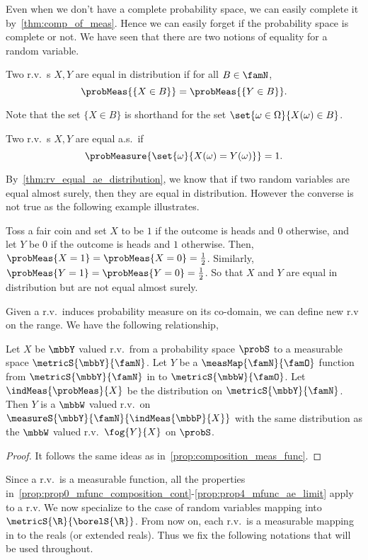Even when we don't have a complete probability space, we can easily complete it by~\ref{thm:comp_of_meas}.
Hence we can easily forget if the probability space is complete or not. We have seen that there are 
two notions of equality for a random variable. 
\begin{Definition}
    Two r.v.~s $X,Y$ are equal in distribution if for all $B \in \famN$, 
    \[\probMeas{\lbrace X\in B \rbrace} = \probMeas{\lbrace Y\in B\rbrace}.\]
\end{Definition}
Note that the set ${\lbrace X\in B \rbrace}$ is shorthand for the set $\set{\omega\in\Omega}{X(\omega)\in B}$.
\begin{Definition}
Two r.v.~s $X,Y$ are equal a.s.~if 
\[\probMeasure{\set{\omega}{X(\omega)=Y(\omega)}} = 1.\]
\end{Definition}
By~\ref{thm:rv_equal_ae_distribution}, we know that if two random variables are equal almost surely, then they
are equal in distribution.
However the converse is not true as the following example illustrates.
\begin{Example}
    Toss a fair coin and set $X$ to be $1$ if the outcome is heads and $0$ otherwise, and let $Y$ be $0$ if
    the outcome is heads and $1$ otherwise. Then, $\probMeas{X=1} = \probMeas{X=0} = \frac{1}{2}$. Similarly,
    $\probMeas{Y=1} = \probMeas{Y=0} = \frac{1}{2}$. So that $X$ and $Y$ are equal in distribution but are not
    equal almost surely.
\end{Example}

Given a r.v.~induces probability measure on its co-domain, we can define new r.v on the range. We have the
following relationship,
\begin{Proposition}
    Let $X$ be $\mbbY$ valued r.v.~from a probability space $\probS$ to a 
    measurable space $\metricS{\mbbY}{\famN}$. Let $Y$ be a $\measMap{\famN}{\famO}$ 
    function from $\metricS{\mbbY}{\famN}$ in to $\metricS{\mbbW}{\famO}$. Let $\indMeas{\probMeas}{X}$ be the
    distribution on $\metricS{\mbbY}{\famN}$. Then $Y$ is a $\mbbW$ valued r.v.~on
    $\measureS{\mbbY}{\famN}{\indMeas{\mbbP}{X}}$ with the same distribution as the $\mbbW$ valued
    r.v.~$\fog{Y}{X}$ on $\probS$.
\end{Proposition}
\begin{proof}
    It follows the same ideas as in~\ref{prop:composition_meas_func}.
\end{proof}
Since a r.v.~is a measurable function, all the
properties in~\ref{prop:prop0_mfunc_composition_cont}-\ref{prop:prop4_mfunc_ae_limit} apply to a r.v.
We now specialize to the case of random variables mapping into $\metricS{\R}{\borelS{\R}}$. From now on, 
each r.v.~is a measurable mapping in to the reals (or extended reals). Thus we fix the following notations
that will be used throughout. 

